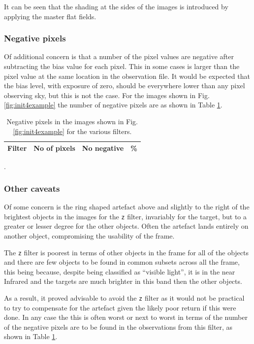 It can be seen that the shading at the sides of the images is introduced by
applying the master flat fields.

\subsubsection{Negative pixels}
\protect\label{section:issuenegpixels}

Of additional concern is that a number of the pixel values are
negative after subtracting the bias value for each pixel. This in some cases is
larger than the pixel value at the same location in the observation file.
It would be expected that the bias level, with exposure of zero, should be
everywhere lower than any pixel observing sky, but this is not the case. For the images shown in Fig.
\ref{fig:init4example} the number of negative pixels are as shown in Table
\ref{table:initexnegpix}.

\begin{table}[!htbp]
\begin{center}
\begin{tabular}{lrrr} \hline
Filter & No of pixels & No negative & \% \\\hline

\hline
\end{tabular}
\end{center}
\caption{Negative pixels in the images shown in Fig. \ref{fig:init4example} for
the various filters.}.
\protect\label{table:initexnegpix}
\end{table}

\subsubsection{Other caveats}
\protect\label{section:otherissues}

Of some concern is the ring shaped artefact above and slightly to the right of
the brightest objects in the images for the \texttt{z} filter, invariably for
the target, but to a greater or lesser degree for the other objects. Often the
artefact lands entirely on another object, compromising the usability of the
frame.

The \texttt{z} filter is poorest in terms of other objects in the frame for all
of the objects and there are few objects to be found in common subsets across
all the frame, this being because, despite being classified as ``visible
light'', it is in the near Infrared and the {\rdwarf} targets are much brighter
in this band then the other objects.

As a result, it proved advisable to avoid the \texttt{z} filter as it would not
be practical to try to compensate for the artefact given the likely poor return
if this were done. In any case the this is often worst or next to worst in terms
of the number of the negative pixels are to be found in the observations from
this filter, as shown in Table \ref{table:initexnegpix}.

\clearpage

